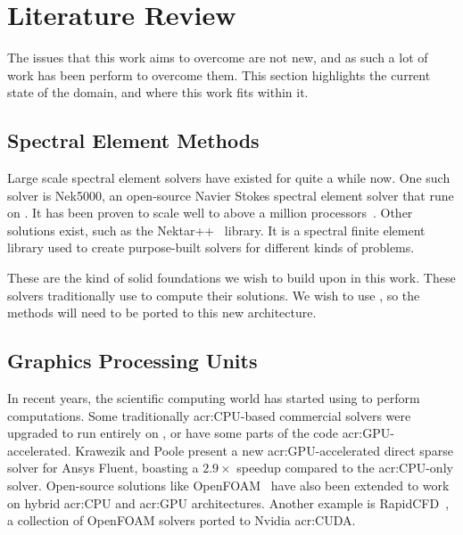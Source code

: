 \chapter{Literature Review}\label{chapter:literature_review} 

The issues that this work aims to overcome are not new, and as such a lot of work has been perform
to overcome them. This section highlights the current state of the domain, and where this work fits
within it.

\section{Spectral Element Methods}\label{section:literature_review:sem}

Large scale spectral element solvers have existed for quite a while now. One such solver is Nek5000,
an open-source Navier Stokes spectral element solver that rune on . It has been
proven to scale well to above a million processors~\cite{Offermans2017}. Other solutions exist, such
as the Nektar++~\cite{Cantwell2015} library. It is a spectral finite element library used to create
purpose-built solvers for different kinds of problems.

These are the kind of solid foundations we wish to build upon in this work. These solvers
traditionally use  to compute their solutions. We wish to use
, so the methods will need to be ported to this new architecture.

\section{Graphics Processing Units}\label{section:literature_review:gpu}

In recent years, the scientific computing world has started using  to perform
computations. Some traditionally \acrshort{acr:CPU}-based commercial solvers were upgraded to run
entirely on , or have some parts of the code \acrshort{acr:GPU}-accelerated.
Krawezik and Poole present a new \acrshort{acr:GPU}-accelerated direct sparse solver for Ansys
Fluent, boasting a \(2.9 \times \) speedup compared to the \acrshort{acr:CPU}-only solver.
Open-source solutions like OpenFOAM~\cite{Alonazi2015} have also been extended to work on hybrid
\acrshort{acr:CPU} and \acrshort{acr:GPU} architectures. Another example is
RapidCFD~\cite{SimFlow2020}, a collection of OpenFOAM solvers ported to Nvidia \acrshort{acr:CUDA}.

